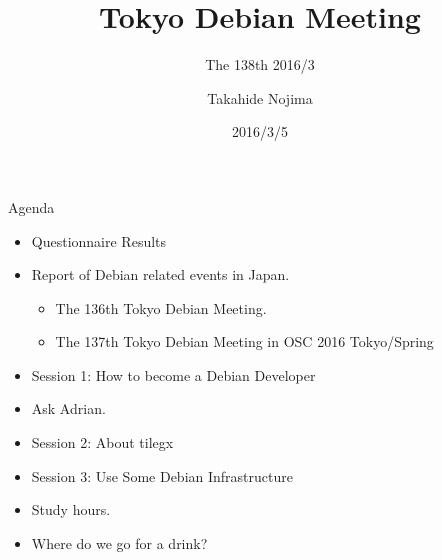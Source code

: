 \title{Tokyo Debian Meeting}
\subtitle{The 138th 2016/3}
\author{Takahide Nojima}
\date{2016/3/5}



\begin{frame}
\titlepage{}
\end{frame}

\begin{frame}{Agenda}
 \begin{minipage}[t]{0.45\hsize}
  \begin{itemize}
   \item Questionnaire Results
   \item Report of Debian related events in Japan.
	 \begin{itemize}
	 \item The 136th Tokyo Debian Meeting.
	 \item The 137th Tokyo Debian Meeting in OSC 2016 Tokyo/Spring
	 \end{itemize}
  \end{itemize}
 \end{minipage} 
 \begin{minipage}[t]{0.45\hsize}
  \begin{itemize}
   \item Session 1: How to become a Debian Developer
   \item Ask Adrian.
   \item Session 2: About tilegx
   \item Session 3: Use Some Debian Infrastructure
   \item Study hours.
   \item Where do we go for a drink?
  \end{itemize}
 \end{minipage}
\end{frame}

